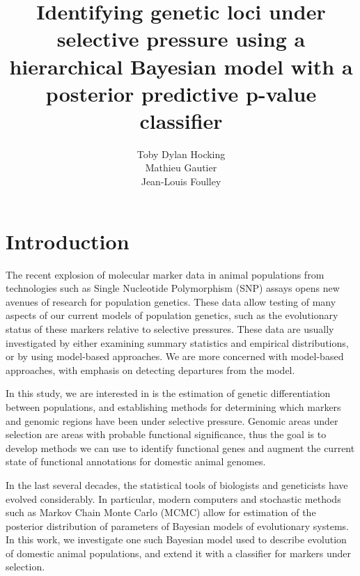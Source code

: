 \documentclass[a4paper,12pt]{article}
\title{Identifying genetic loci under selective pressure using a
  hierarchical Bayesian model with a posterior predictive p-value
  classifier} \author{Toby Dylan Hocking\\Mathieu Gautier\\Jean-Louis Foulley}
\begin{document}
\maketitle
\tableofcontents
\newpage
\listoffigures
\newpage

\newcommand{\fig}[3][1]{
  \begin{figure}[htp]
    \begin{center}          %
    \texttt{[image: \#2]}
    \end{center}
    \caption{#3\label{#2}}
  \end{figure}
}
\newcommand{\brat}[2]{
  \left[
    \begin{array}{#1}
      #2
    \end{array}
    \right]
}
\newcommand{\aij}{\alpha_{ij}(t)}
\newcommand{\aijs}{\alpha_{ij}^*(t)}
\newcommand{\wij}[1]{w_{ij}^{\text{#1}}}
\newcommand{\etal}{\emph{et al.}}
\newcommand{\RR}{\mathbb R}
\newcommand{\Bin}{\operatorname{Binomial}}

\section{Introduction}

The recent explosion of molecular marker data in animal populations
from technologies such as Single Nucleotide Polymorphism (SNP) assays
opens new avenues of research for population genetics. These data
allow testing of many aspects of our current models of population
genetics, such as the evolutionary status of these markers relative to
selective pressures. These data are usually investigated by either
examining summary statistics and empirical distributions, or by using
model-based approaches. We are more concerned with model-based
approaches, with emphasis on detecting departures from the model.

In this study, we are interested in is the estimation of genetic
differentiation between populations, and establishing methods for
determining which markers and genomic regions have been under
selective pressure. Genomic areas under selection are areas with
probable functional significance, thus the goal is to develop methods
we can use to identify functional genes and augment the current state
of functional annotations for domestic animal genomes.

In the last several decades, the statistical tools of biologists and
geneticists have evolved considerably. In particular, modern computers
and stochastic methods such as Markov Chain Monte Carlo (MCMC) allow
for estimation of the posterior distribution of parameters of Bayesian
models of evolutionary systems. In this work, we investigate one such
Bayesian model used to describe evolution of domestic animal
populations, and extend it with a classifier for markers under
selection.
\end{document}
